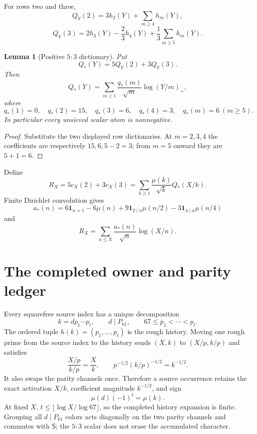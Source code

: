 \documentclass[11pt]{article}
\newtheorem{lemma}[theorem]{Lemma}
\newcommand{\1}{\mathbf 1}
\begin{document}
For rows two and three,
\[
Q_Y(2)=3h_2(Y)+\sum_{m\ge4}h_m(Y),
\]
\[
Q_Y(3)=2h_3(Y)-\frac23h_4(Y)+\frac13\sum_{m\ge5}h_m(Y).
\]

\begin{lemma}[Positive $5{:}3$ dictionary]\label{lem:qstar}
Put
\[
Q_*(Y)=5Q_Y(2)+3Q_Y(3).
\]
Then
\[
Q_*(Y)=\sum_{m\ge1}\frac{q_*(m)}{\sqrt m}\log(Y/m)_+,
\]
where
\[
q_*(1)=0,\quad q_*(2)=15,\quad q_*(3)=6,\quad q_*(4)=3,
\quad q_*(m)=6\ (m\ge5).
\]
In particular every unsieved scalar atom is nonnegative.
\end{lemma}
\begin{proof}
Substitute the two displayed row dictionaries.  At $m=2,3,4$ the coefficients are respectively $15,6,5-2=3$; from $m=5$ onward they are $5+1=6$.
\end{proof}

Define
\begin{equation}\label{eq:R}
R_X=5c_X(2)+3c_X(3)
    =\sum_{k\ge1}\frac{\mu(k)}{\sqrt k}Q_*(X/k).
\end{equation}
Finite Dirichlet convolution gives
\begin{equation}\label{eq:astar}
a_*(n)=6\1_{n=1}-6\mu(n)
+9\1_{2\mid n}\mu(n/2)-3\1_{4\mid n}\mu(n/4)
\end{equation}
and
\[
R_X=\sum_{n\le X}\frac{a_*(n)}{\sqrt n}\log(X/n).
\]

\section{The completed owner and parity ledger}

Every squarefree source index has a unique decomposition
\begin{equation}\label{eq:factor}
k=d p_1\cdots p_t,
\qquad d\mid P_{61},
\qquad67\le p_1<\cdots<p_t.
\end{equation}
The ordered tuple $h(k)=(p_1,\ldots,p_t)$ is the rough history.  Moving one rough prime from the source index to the history sends $(X,k)$ to $(X/p,k/p)$ and satisfies
\begin{equation}\label{eq:activation}
\frac{X/p}{k/p}=\frac Xk,
\qquad
p^{-1/2}(k/p)^{-1/2}=k^{-1/2}.
\end{equation}
It also swaps the parity channels once.  Therefore a source occurrence retains the exact activation $X/k$, coefficient magnitude $k^{-1/2}$, and sign
\[
\mu(d)(-1)^t=\mu(k).
\]
At fixed $X$, $t\le\lfloor\log X/\log67\rfloor$, so the completed history expansion is finite.  Grouping all $d\mid P_{61}$ colors acts diagonally on the two parity channels and commutes with $\mathsf S$; the $5{:}3$ scalar does not erase the accumulated character.
\end{document}
